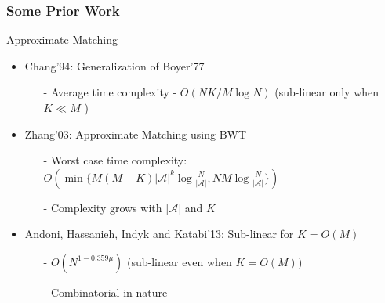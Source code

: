 \documentclass[10pt,xcolor=table]{beamer}
\newcommand{\mc}{\mathcal}
\begin{document}
\begin{frame} \frametitle{Some Prior Work}
	\vspace{-0.2cm}
	\begin{block}{\alert{Approximate Matching}}
		
	 	\begin{itemize}
	 		\item {Chang'94}: Generalization of Boyer'77
	 		\begin{itemize}
	 			\item[-] Average time complexity - $O(NK/M \log N)$ (sub-linear only when $K \ll M$ )
	 		\end{itemize}
	 		
	 		\item {Zhang'03}: Approximate Matching using BWT
	 			\begin{itemize}
	 				\item[-] Worst case time complexity: $O(\min\{M(M-K){|\mc{A}|}^k\log \frac{N}{|\mc{A}|} , NM \log \frac{N}{|\mc{A}|}\})$
	 				\item[-] Complexity grows with $|\mc{A}|$ and $K$
	 			\end{itemize}
	 		\pause	
	 		\item {Andoni, Hassanieh, Indyk and Katabi'13}: Sub-linear for $K = O(M)$
	 		\begin{itemize}
                \item[-] \textcolor[rgb]{0.00,0.00,1.00}{$O\left(N^{1-0.359\mu}\right)$ (sub-linear even when $K = O(M)$)}
	 			\item[-] Combinatorial in nature
	 		\end{itemize}
	 	\end{itemize}
	 	
	 \end{block}
\end{frame}
	
\end{document}
